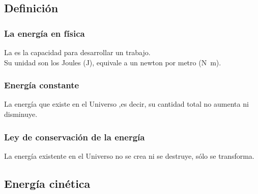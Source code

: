 \documentclass[14pt]{beamer}
\begin{document}
\subsection{Definición}

\begin{frame}
\frametitle{La energía en física}
La  es la capacidad para desarrollar un trabajo.
\\
\bigskip
\pause
Su unidad son los Joules (J), equivale a un newton por metro (\unit{\newton\meter}).
\end{frame}
\begin{frame}
\frametitle{Energía constante}
La energía que existe en el Universo ,\pause es decir, su cantidad total no aumenta ni disminuye.
\end{frame}
\begin{frame}
\frametitle{Ley de conservación de la energía}
La energía existente en el Universo no se crea ni se destruye, sólo se transforma.
\end{frame}

\subsection{Energía cinética}
\end{document}
